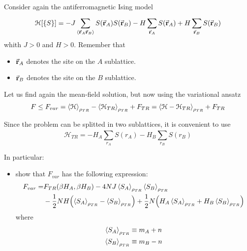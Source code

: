 \documentclass[../main/main.tex]{subfiles}
\begin{document}
\begin{exercise}{}{}
Consider again the antiferromagnetic Ising model
\begin{equation*}
  \mathcal{H}[\{ S \}  ] = - J \sum_{\expval{\va{r}_A \va{r}_B} }^{} S (\va{r}_A) S(\va{r}_B) - H \sum_{\va{r}_A}^{} S (\va{r}_A) + H \sum_{\va{r}_B}^{} S (\va{r}_B)
\end{equation*}
whith \( J>0 \) and \( H>0 \). Remember that
\begin{itemize}
\item \( \va{r}_A \) denotes the site on the \( A \) sublattice.
\item \( \va{r}_B \) denotes the site on the \( B \) sublattice.
\end{itemize}

Let us find again the mean-field solution, but now using the variational ansatz
\begin{equation*}
  F \le F_{var} = \expval{\mathcal{H}}_{\rho _{TR}} - \expval{\mathcal{H}_{TR} }_{\rho _{TR}}  + F_{TR} = \expval{\mathcal{H} - \mathcal{H}_{TR}}_{\rho _{TR}} + F_{TR}
\end{equation*}
\begin{remark}
  Since the problem can be splitted in two sublattices, it is convenient to use
  \begin{equation*}
    \mathcal{H}_{TR} = - H_A \sum_{r_A}^{} S(r_A) - H_B \sum_{r_B}^{}  S(r_B)
  \end{equation*}
\end{remark}
In particular:
\begin{itemize}
\item show that \( F_{var} \) has the following expression:
\begin{equation*}
\begin{split}
F_{var}  = &  F_{TR} (\beta H_A, \beta H_B)
- 4 NJ \expval{S_A}_{\rho _{TR}}  \expval{S_B}_{\rho _{TR}} \\
 &- \frac{1}{2} NH \qty(\expval{S_A}_{\rho _{TR}}
 - \expval{S_B}_{\rho _{TR}}   )
 + \frac{1}{2} N \qty(H_A \expval{S_A}_{\rho _{TR}}  + H_B \expval{S_B}_{\rho _{TR}}   )
\end{split}
\end{equation*}
where
\begin{subequations}
\begin{align*}
   \expval{S_A}_{\rho _{TR}}  & \equiv m_A + n \\
    \expval{S_B}_{\rho _{TR}}  & \equiv m_B - n
\end{align*}
\end{subequations}

\end{itemize}
\end{exercise}
\end{document}
